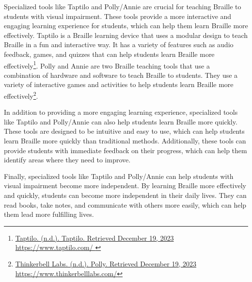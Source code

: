 Specialized tools like Taptilo and Polly/Annie are crucial for teaching Braille to students with visual impairment. These tools provide a more interactive and engaging learning experience for students, which can help them learn Braille more effectively. Taptilo is a Braille learning device that uses a modular design to teach Braille in a fun and interactive way. It has a variety of features such as audio feedback, games, and quizzes that can help students learn Braille more effectively\footnote{\raggedright \href{https://www.taptilo.com/ }{Taptilo. (n.d.). Taptilo. Retrieved December 19, 2023} \href{https://www.taptilo.com/ }{https://www.taptilo.com/ }}. Polly and Annie are two Braille teaching tools that use a combination of hardware and software to teach Braille to students. They use a variety of interactive games and activities to help students learn Braille more effectively\footnote{\raggedright \href{https://www.thinkerbelllabs.com/}{Thinkerbell Labs. (n.d.). Polly. Retrieved December 19, 2023} \href{https://www.thinkerbelllabs.com/}{https://www.thinkerbelllabs.com/}}.

In addition to providing a more engaging learning experience, specialized tools like Taptilo and Polly/Annie can also help students learn Braille more quickly. These tools are designed to be intuitive and easy to use, which can help students learn Braille more quickly than traditional methods. Additionally, these tools can provide students with immediate feedback on their progress, which can help them identify areas where they need to improve.

Finally, specialized tools like Taptilo and Polly/Annie can help students with visual impairment become more independent. By learning Braille more effectively and quickly, students can become more independent in their daily lives. They can read books, take notes, and communicate with others more easily, which can help them lead more fulfilling lives.

